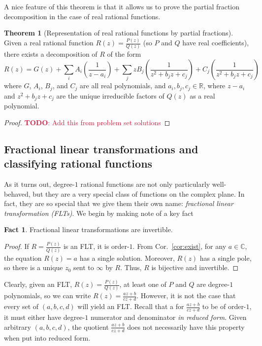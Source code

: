 \documentclass[aps,pra,showpacs,notitlepage,onecolumn,superscriptaddress,nofootinbib]{revtex4-1}
\newcommand{\pop}[1]{\textcolor{crimson}{#1}}
\theoremstyle{definition}
\newtheorem{theorem}{Theorem}[section]
\newtheorem{fact}{Fact}[section]
\begin{document}
\noindent A nice feature of this theorem is that it allows us to prove the partial fraction decomposition in the case of real rational functions.

\begin{theorem}[Representation of real rational functions by partial fractions]
  Given a real rational function $R(z) = \frac{P(z)}{Q(z)}$ (so $P$ and $Q$ have real coefficients), there exists a decomposition of $R$ of the form
  \begin{equation}
    \label{eq:r_decomp}
    R(z) = G(z) + \displaystyle\sum_{i} A_i \left( \frac{1}{z - a_i} \right) + \displaystyle\sum_{j} z B_j \left( \frac{1}{z^2 + b_j z + c_j} \right) + C_j \left( \frac{1}{z^2 + b_j z + c_j} \right)
  \end{equation}
  where $G$, $A_i$, $B_j$, and $C_j$ are all real polynomials, and $a_i, b_j, c_j \in \mathbb{R}$, where $z - a_i$ and $z^2 + b_j z + c_j$ are the unique irreducible factors of $Q(z)$ as a real polynomial.
\end{theorem}

\begin{proof}
  \pop{\textbf{TODO}: Add this from problem set solutions}
  \end{proof}

\subsection{Fractional linear transformations and classifying rational functions}

\noindent As it turns out, degree-$1$ rational functions are not only particularly well-behaved, but they are a very special class of functions on the complex plane. In fact, they are
so special that we give them their own name: \emph{fractional linear transformation (FLTs)}. We begin by making note of a key fact

\begin{fact}
  Fractional linear transformations are invertible.
\end{fact}
\begin{proof}
  If $R = \frac{P(z)}{Q(z)}$ is an FLT, it is order-$1$. From Cor.~\ref{cor:exist}, for any $a \in \mathbb{C}$, the equation $R(z) = a$ has a single solution. Moreover, $R(z)$ has a single pole, so there is a unique $z_0$ sent to $\infty$
  by $R$. Thus, $R$ is bijective and invertible.
\end{proof}

\noindent Clearly, given an FLT, $R(z) = \frac{P(z)}{Q(z)}$, at least one of $P$ and $Q$ are degree-$1$ polynomials, so we can write $R(z) = \frac{az + b}{cz + d}$. However, it is not the case that every set of $(a, b, c, d)$ will yield an FLT. Recall
that a for $\frac{az + b}{cz + d}$ to be of order-$1$, it must either have degree-$1$ numerator and denominator \emph{in reduced form}. Given arbitrary $(a, b, c, d)$, the quotient $\frac{az + b}{cz + d}$ does not necessarily have this property
when put into reduced form.
\end{document}

